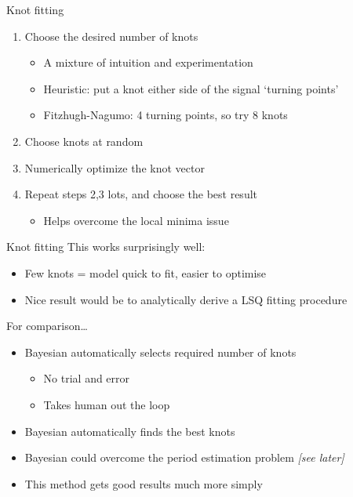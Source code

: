 \documentclass[presentation]{beamer}
\begin{document}
\begin{frame}[label={sec:org49a670f}]{Knot fitting}
\begin{enumerate}[<+->]
\item Choose the desired number of knots
\begin{itemize}
\item A mixture of intuition and experimentation
\item Heuristic: put a knot either side of the signal `turning points'
\item Fitzhugh-Nagumo: 4 turning points, so try 8 knots
\end{itemize}
\item Choose knots at random
\item Numerically optimize the knot vector
\item Repeat steps 2,3 lots, and choose the best result
\begin{itemize}
\item Helps overcome the local minima issue
\end{itemize}
\end{enumerate}
\end{frame}

\begin{frame}[label={sec:orgffc5b4d}]{Knot fitting}
This works surprisingly well:
\begin{itemize}
\item Few knots = model quick to fit, easier to optimise
\item Nice result would be to analytically derive a LSQ fitting procedure
\end{itemize}
\vfill
For comparison\ldots{}
\begin{itemize}[<+->]
\item Bayesian automatically selects required number of knots
\begin{itemize}
\item No trial and error
\item Takes human out the loop
\end{itemize}
\item Bayesian automatically finds the best knots
\item Bayesian could overcome the period estimation problem \emph{[see later]}
\item This method gets good results much more simply
\end{itemize}
\end{frame}
\end{document}

